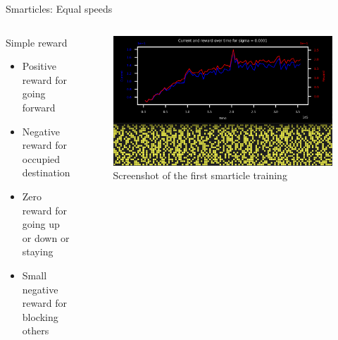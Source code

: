 \documentclass[10pt,xcolor=table, aspectratio=1610]{beamer}
\begin{document}
\begin{frame}{Smarticles: Equal speeds}
  \begin{columns}
    \begin{block}{Simple reward}
      \begin{itemize}
        \item Positive reward for going forward
        \item Negative reward for occupied destination
        \item Zero reward for going up or down or staying
        \item Small negative reward for blocking others
      \end{itemize}
    \end{block}

      \begin{figure}
        \includegraphics[width=\textwidth]{../Thesis/img/results/first_training_screenshot.png}
        \caption*{Screenshot of the first smarticle training}
      \end{figure}
      
  \end{columns}

\end{frame}
\end{document}
